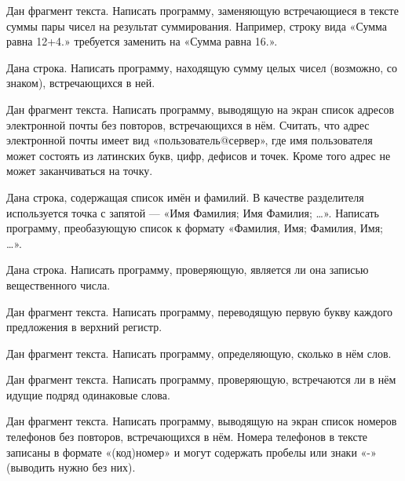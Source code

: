 \task Дан фрагмент текста. Написать программу, заменяющую
встречающиеся в тексте суммы пары чисел на результат
суммирования. Например, строку вида «Сумма равна 12+4.» требуется
заменить на «Сумма равна 16.».

\task Дана строка. Написать программу, находящую сумму целых чисел
(возможно, со знаком), встречающихся в ней.

\task Дан фрагмент текста. Написать программу, выводящую на экран
список адресов электронной почты без повторов, встречающихся в
нём. Считать, что адрес электронной почты имеет вид
«пользователь@сервер», где имя пользователя может состоять из
латинских букв, цифр, дефисов и точек. Кроме того адрес не может
заканчиваться на точку.

\task Дана строка, содержащая список имён и фамилий. В качестве
разделителя используется точка с запятой — «Имя Фамилия; Имя Фамилия;
…». Написать программу, преобазующую список к формату «Фамилия, Имя;
Фамилия, Имя; …».

\task Дана строка. Написать программу, проверяющую, является ли она
записью вещественного числа.

\task Дан фрагмент текста. Написать программу, переводящую первую букву
каждого предложения в верхний регистр.

\task Дан фрагмент текста. Написать программу, определяющую, сколько в
нём слов.

\task Дан фрагмент текста. Написать программу, проверяющую,
встречаются ли в нём идущие подряд одинаковые слова.

\task Дан фрагмент текста. Написать программу, выводящую на экран
список номеров телефонов без повторов, встречающихся в нём. Номера
телефонов в тексте записаны в формате «(код)номер» и могут содержать
пробелы или знаки «-» (выводить нужно без них).
